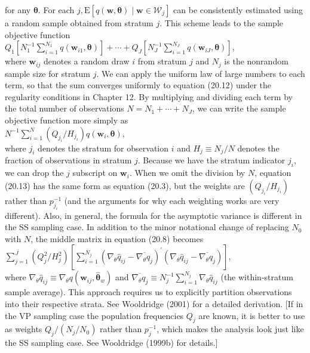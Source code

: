 \documentclass[10pt]{article}
\begin{document}
for any $\boldsymbol{\theta}$. For each $j, \mathrm{E}\left[q(\mathbf{w}, \boldsymbol{\theta}) \mid \mathbf{w} \in \mathscr{W}_{j}\right]$ can be consistently estimated using a random sample obtained from stratum $j$. This scheme leads to the sample objective function\\
$Q_{1}\left[N_{1}^{-1} \sum_{i=1}^{N_{1}} q\left(\mathbf{w}_{i 1}, \boldsymbol{\theta}\right)\right]+\cdots+Q_{J}\left[N_{J}^{-1} \sum_{i=1}^{N_{J}} q\left(\mathbf{w}_{i J}, \boldsymbol{\theta}\right)\right]$,\\
where $\mathbf{w}_{i j}$ denotes a random draw $i$ from stratum $j$ and $N_{j}$ is the nonrandom sample size for stratum $j$. We can apply the uniform law of large numbers to each term, so that the sum converges uniformly to equation (20.12) under the regularity conditions in Chapter 12. By multiplying and dividing each term by the total number of observations $N=N_{1}+\cdots+N_{J}$, we can write the sample objective function more simply as\\
$N^{-1} \sum_{i=1}^{N}\left(Q_{j_{i}} / H_{j_{i}}\right) q\left(\mathbf{w}_{i}, \boldsymbol{\theta}\right)$,\\
where $j_{i}$ denotes the stratum for observation $i$ and $H_{j} \equiv N_{j} / N$ denotes the fraction of observations in stratum $j$. Because we have the stratum indicator $j_{i}$, we can drop the $j$ subscript on $\mathbf{w}_{i}$. When we omit the division by $N$, equation (20.13) has the same form as equation (20.3), but the weights are $\left(Q_{j_{i}} / H_{j_{i}}\right)$ rather than $p_{j_{i}}^{-1}$ (and the arguments for why each weighting works are very different). Also, in general, the formula for the asymptotic variance is different in the SS sampling case. In addition to the minor notational change of replacing $N_{0}$ with $N$, the middle matrix in equation (20.8) becomes\\
$\sum_{j=1}^{J}\left(Q_{j}^{2} / H_{j}^{2}\right)\left[\sum_{i=1}^{N_{j}}\left(\nabla_{\theta} \hat{q}_{i j}-\overline{\nabla_{\theta} q_{j}}\right)^{\prime}\left(\nabla_{\theta} \hat{q}_{i j}-\overline{\nabla_{\theta} q_{j}}\right)\right]$,\\
where $\nabla_{\theta} \hat{q}_{i j} \equiv \nabla_{\theta} q\left(\mathbf{w}_{i j}, \hat{\boldsymbol{\theta}}_{w}\right)$ and $\overline{\nabla_{\theta} q_{j}} \equiv N_{j}^{-1} \sum_{i=1}^{N_{j}} \nabla_{\theta} \hat{q}_{i j}$ (the within-stratum sample average). This approach requires us to explicitly partition observations into their respective strata. See Wooldridge (2001) for a detailed derivation. [If in the VP sampling case the population frequencies $Q_{j}$ are known, it is better to use as weights $Q_{j} /\left(N_{j} / N_{0}\right)$ rather than $p_{j}^{-1}$, which makes the analysis look just like the SS sampling case. See Wooldridge (1999b) for details.]
\end{document}
